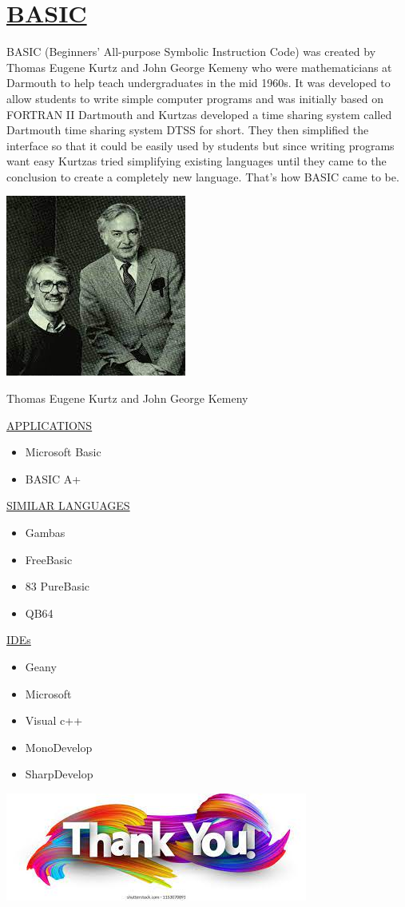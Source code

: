 \documentclass{article}
\begin{document}
\newpage
\section{\underline{BASIC}}
BASIC (Beginners' All-purpose Symbolic Instruction Code) was created by Thomas Eugene Kurtz  and John George Kemeny who were mathematicians at Darmouth to help teach undergraduates in the mid 1960s. It was developed to allow students to write simple computer programs and was initially based on FORTRAN II
Dartmouth and Kurtzas developed a time sharing system called Dartmouth time sharing system DTSS for short. They then simplified the interface so that it could be easily used by students but since writing programs want easy Kurtzas tried simplifying existing languages until they came to the conclusion to create a completely new language. That’s how BASIC came to be. 

\newpage
\includegraphics{basic guys.jpg}
\caption{Thomas Eugene Kurtz  and John George Kemeny}
\newpage
\underline{APPLICATIONS}
\begin{itemize}
	\item Microsoft Basic
	\item BASIC A+
	\end{itemize}

\underline{SIMILAR LANGUAGES}
\begin{itemize}
\item Gambas
\item FreeBasic
\item 83 PureBasic
\item QB64
\end{itemize}

\underline{IDEs}
\begin{itemize}
\item Geany
\item Microsoft \item Visual c++
\item MonoDevelop
\item SharpDevelop
\end{itemize}

\newpage
\includegraphics{thanks.jpg}

	
\end{document}
